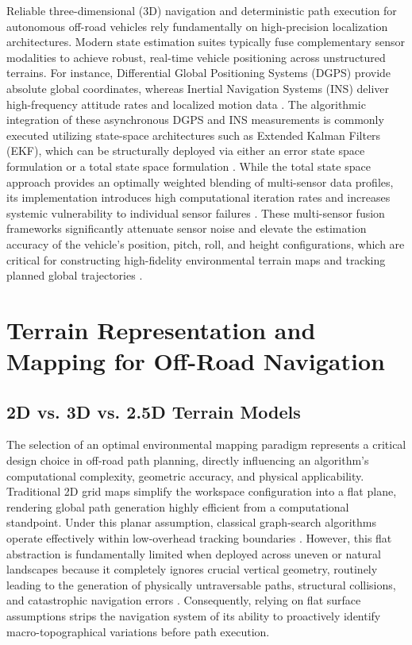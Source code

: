 Reliable three-dimensional (3D) navigation and deterministic path execution for autonomous off-road
vehicles rely fundamentally on high-precision localization architectures. Modern state estimation
suites typically fuse complementary sensor modalities to achieve robust, real-time vehicle
positioning across unstructured terrains. For instance, Differential Global Positioning Systems
(DGPS) provide absolute global coordinates, whereas Inertial Navigation Systems (INS) deliver
high-frequency attitude rates and localized motion data \citep{Xiang_2006_3dpositioning}. The algorithmic integration of
these asynchronous DGPS and INS measurements is commonly executed utilizing state-space
architectures such as Extended Kalman Filters (EKF), which can be structurally deployed via either
an error state space formulation or a total state space formulation \citep{Xiang_2006_3dpositioning}. While the total
state space approach provides an optimally weighted blending of multi-sensor data profiles, its
implementation introduces high computational iteration rates and increases systemic vulnerability to
individual sensor failures \citep{Xiang_2006_3dpositioning}. These multi-sensor fusion frameworks significantly
attenuate sensor noise and elevate the estimation accuracy of the vehicle's position, pitch, roll,
and height configurations, which are critical for constructing high-fidelity environmental terrain
maps and tracking planned global trajectories \citep{Xiang_2006_3dpositioning, Hameed_2021_comprehensivereview}.

\section{Terrain Representation and Mapping for Off-Road Navigation}

\subsection{2D vs. 3D vs. 2.5D Terrain Models}

The selection of an optimal environmental mapping paradigm represents a critical design choice in
off-road path planning, directly influencing an algorithm's computational complexity, geometric
accuracy, and physical applicability. Traditional 2D grid maps simplify the workspace configuration
into a flat plane, rendering global path generation highly efficient from a computational
standpoint. Under this planar assumption, classical graph-search algorithms operate effectively
within low-overhead tracking boundaries \citep{Karur_2021_surveypath}. However, this flat abstraction is
fundamentally limited when deployed across uneven or natural landscapes because it completely
ignores crucial vertical geometry, routinely leading to the generation of physically untraversable
paths, structural collisions, and catastrophic navigation errors \citep{Bettencourt_2025_indoor25d}. Consequently,
relying on flat surface assumptions strips the navigation system of its ability to proactively
identify macro-topographical variations before path execution.

